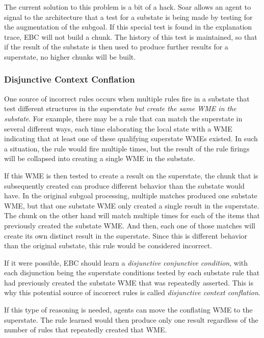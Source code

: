 The current solution to this problem is a bit of a hack.  Soar allows an agent to signal to the architecture that a test for a substate is being made by testing for the  augmentation of the subgoal. If this special test is found in the explanation trace, EBC will not build a chunk. The history of this test is maintained, so that if the result of the substate is then used to produce further results for a superstate, no higher chunks will be built. 

\subsubsection{Disjunctive Context Conflation}

One source of incorrect rules occurs when multiple rules fire in a substate that test different structures in the superstate \emph{but create the same WME in the substate}. For example, there may be a rule that can match the superstate in several different ways, each time elaborating the local state with a WME indicating that at least one of these qualifying superstate WMEs existed. In such a situation, the rule would fire multiple times, but the result of the rule firings will be collapsed into creating a single WME in the substate. 

If this WME is then tested to create a result on the superstate, the chunk that is subsequently created can produce different behavior than the substate would have. In the original subgoal processing, multiple matches produced one substate WME, but that one substate WME only created a single result in the superstate.  The chunk on the other hand will match multiple times for each of the items that previously created the substate WME.  And then, each one of those matches will create its own distinct result in the superstate.   Since this is different behavior than the original substate, this rule would be considered incorrect. 

If it were possible, EBC should learn a \textit{disjunctive conjunctive condition}, with each disjunction being the superstate conditions tested by each substate rule that had previously created the substate WME that was repeatedly asserted.  This is why this potential source of incorrect rules is called \textit{disjunctive context conflation}.

If this type of reasoning is needed, agents can move the conflating WME to the superstate.  The rule learned would then produce only one result regardless of the number of rules that repeatedly created that WME. 

